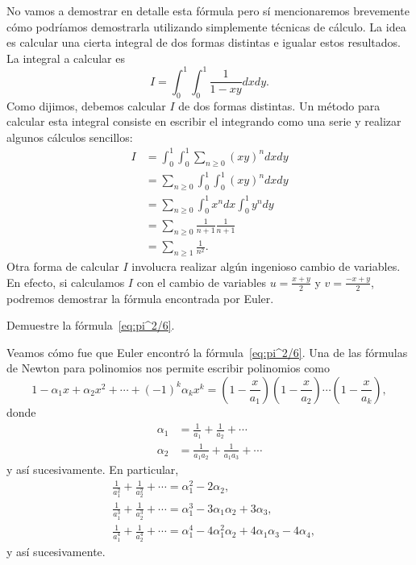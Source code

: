 No vamos a demostrar en detalle esta fórmula pero sí mencionaremos brevemente
cómo podríamos demostrarla utilizando simplemente técnicas de cálculo. La idea
es calcular una cierta integral de dos formas distintas e igualar estos
resultados. La integral a calcular es 
\[
		I=\int_0^1\int_0^1 \frac{1}{1-xy}dxdy.
	\]
Como dijimos, debemos calcular $I$ de dos formas distintas.  Un método para
calcular esta integral consiste en escribir el integrando como una serie y
realizar algunos cálculos sencillos: 
	\begin{align*}
		I&=\int_0^1\int_0^1 \sum_{n\geq0}(xy)^ndxdy\\
		&=\sum_{n\geq0}\int_0^1\int_0^1 (xy)^ndxdy\\
		&=\sum_{n\geq0}\int_0^1x^ndx\int_0^1y^ndy\\
		&=\sum_{n\geq0}\frac{1}{n+1}\frac{1}{n+1}\\
		&=\sum_{n\geq1}\frac{1}{n^2}.
	\end{align*}
Otra forma de calcular $I$ involucra realizar algún ingenioso cambio de
variables. En efecto, si calculamos $I$ con el cambio de variables
$u=\frac{x+y}{2}$ y $v=\frac{-x+y}{2}$, podremos demostrar la fórmula
encontrada por Euler. 

\begin{exercise}
	Demuestre la fórmula~\eqref{eq:pi^2/6}.
\end{exercise}

Veamos cómo fue que Euler encontró la fórmula~\eqref{eq:pi^2/6}. Una de las
fórmulas de Newton para polinomios nos permite escribir polinomios como
\[
	1-\alpha_1x+\alpha_2x^2+\cdots+(-1)^k\alpha_kx^k
	=\left(1-\frac{x}{a_1}\right)\left(1-\frac{x}{a_2}\right)\cdots\left(1-\frac{x}{a_k}\right),
\]
donde 
\begin{align*}
	\alpha_1&=\frac{1}{a_1}+\frac{1}{a_2}+\cdots\\
	\alpha_2&=\frac{1}{a_1a_2}+\frac{1}{a_1a_3}+\cdots
\end{align*}
y así sucesivamente. En particular, 
\begin{align*}
	&\frac{1}{a_1^2}+\frac{1}{a_2^2}+\cdots = \alpha_1^2-2\alpha_2,\\
	&\frac{1}{a_1^3}+\frac{1}{a_2^3}+\cdots = \alpha_1^3-3\alpha_1\alpha_2+3\alpha_3,\\
	&\frac{1}{a_1^4}+\frac{1}{a_2^4}+\cdots = \alpha_1^4-4\alpha^2_1\alpha_2+4\alpha_1\alpha_3-4\alpha_4,
\end{align*}
y así sucesivamente. 

